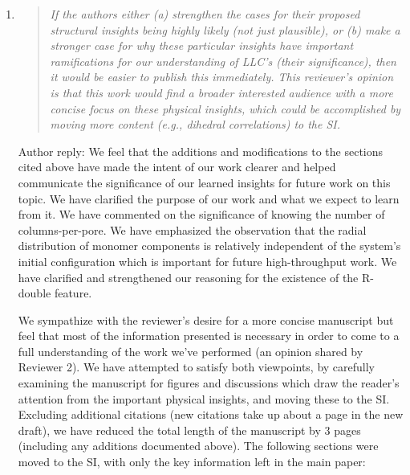 \documentclass{article}
\begin{document}
\begin{enumerate}

	\item \begin{quote}
    \textit{If the authors either (a) strengthen the cases for their proposed structural
    insights being  highly likely (not just plausible), or (b) make a stronger case for
    why these particular insights have important ramifications for our understanding of 
    LLC's (their significance), then it would be easier to publish this immediately. This
    reviewer's opinion is that this work would find a broader interested audience with a more
    concise focus on these physical insights, which could be accomplished by moving more
    content (e.g., dihedral correlations) to the SI.}
    \end{quote}
    
    Author reply: We feel that the additions and modifications to the sections cited above 
    have made the intent of our work clearer and helped communicate the significance of 
    our learned insights for future work on this topic. We have clarified the purpose of our work
    and what we expect to learn from it. We have commented on the significance of knowing the
    number of columns-per-pore. We have emphasized the observation that the radial distribution
    of monomer components is relatively independent of the system's initial configuration
    which is important for future high-throughput work. We have clarified and strengthened our
    reasoning for the existence of the R-double feature.
    
    We sympathize with the reviewer's desire for a more concise manuscript but feel that most 
    of the information presented is necessary in order to come to a full understanding of the 
    work we've performed (an opinion shared by Reviewer 2). 
    We have attempted to satisfy both viewpoints, by carefully examining the manuscript for figures 
    and discussions which draw the reader's attention from the important physical insights, and moving 
    these to the SI. 
    Excluding additional citations (new citations
    take up about a page in the new draft), we have reduced the total length of the manuscript 
    by 3 pages (including any additions documented above). 
    The following sections were moved to the SI, with only the key information left in the main paper:
    \begin{itemize}
    

\end{itemize}
\end{enumerate}
\end{document}
